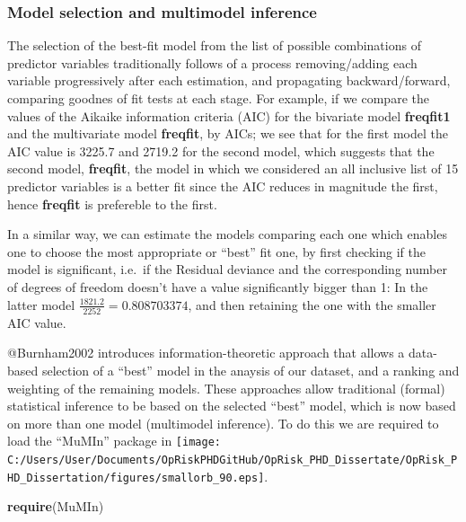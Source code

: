 \documentclass[]{article}
\newenvironment{Shaded}{\begin{snugshade}}{\end{snugshade}}
\newcommand{\KeywordTok}[1]{\textcolor[rgb]{0.13,0.29,0.53}{\textbf{#1}}}
\newcommand{\NormalTok}[1]{#1}
\begin{document}
\doublespacing

\singlespacing

\doublespacing

\subsubsection{Model selection and multimodel inference}

The selection of the best-fit model from the list of possible
combinations of predictor variables traditionally follows of a process
removing/adding each variable progressively after each estimation, and
propagating backward/forward, comparing goodnes of fit tests at each
stage. For example, if we compare the values of the Aikaike information
criteria (AIC) for the bivariate model \textbf{freqfit1} and the
multivariate model \textbf{freqfit}, by AICs; we see that for the first
model the AIC value is 3225.7 and 2719.2 for the second model, which
suggests that the second model, \textbf{freqfit}, the model in which we
considered an all inclusive list of 15 predictor variables is a better
fit since the AIC reduces in magnitude the first, hence \textbf{freqfit}
is prefereble to the first. \medskip

In a similar way, we can estimate the models comparing each one which
enables one to choose the most appropriate or ``best'' fit one, by first
checking if the model is significant, i.e.~if the Residual deviance and
the corresponding number of degrees of freedom doesn't have a value
significantly bigger than 1: In the latter model
\(\frac{1821.2}{2252} = 0.808703374\), and then retaining the one with
the smaller AIC value.\medskip 

@Burnham2002 introduces information-theoretic approach that allows a
data-based selection of a ``best'' model in the anaysis of our dataset,
and a ranking and weighting of the remaining models. These approaches
allow traditional (formal) statistical inference to be based on the
selected ``best'' model, which is now based on more than one model
(multimodel inference). To do this we are required to load the ``MuMIn''
package in
\texttt{[image: C:/Users/User/Documents/OpRiskPHDGitHub/OpRisk\_PHD\_Dissertate/OpRisk\_PHD\_Dissertation/figures/smallorb\_90.eps]}.
\medskip

\singlespacing

\begin{Shaded}
\begin{Highlighting}[]
\KeywordTok{require}\NormalTok{(MuMIn)}
\end{Highlighting}
\end{Shaded}
\end{document}
